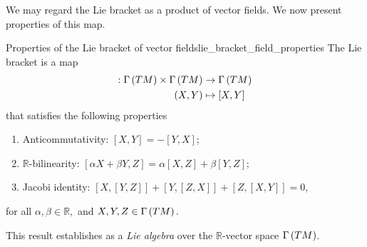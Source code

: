 We may regard the Lie bracket as a product of vector fields. We now present properties of this map.
\begin{proposition}{Properties of the Lie bracket of vector fields}{lie_bracket_field_properties}
    The Lie bracket is a map
    \begin{align*}
        [\cdot, \cdot] : \sections{TM} \times \sections{TM} &\to \sections{TM}\\
                                                      (X,Y) &\mapsto [X,Y]
    \end{align*}
    that satisfies the following properties
    \begin{enumerate}[label=(\alph*)]
        \item Anticommutativity: \([X,Y] = -[Y,X]\);
        \item \(\mathbb{R}\)-bilinearity: \([\alpha X + \beta Y, Z] = \alpha[X,Z] + \beta[Y,Z]\);
        \item Jacobi identity: \([X, [Y, Z]] + [Y, [Z, X]] + [Z, [X, Y]] = 0\),
    \end{enumerate}
    for all \(\alpha,\beta\in \mathbb{R},\) and \(X,Y,Z \in \Gamma\left(TM\right).\)
\end{proposition}
\begin{remark}
    This result establishes  as a \emph{Lie algebra} over the \(\mathbb{R}\)-vector space \(\Gamma\left(TM\right)\).
\end{remark}
